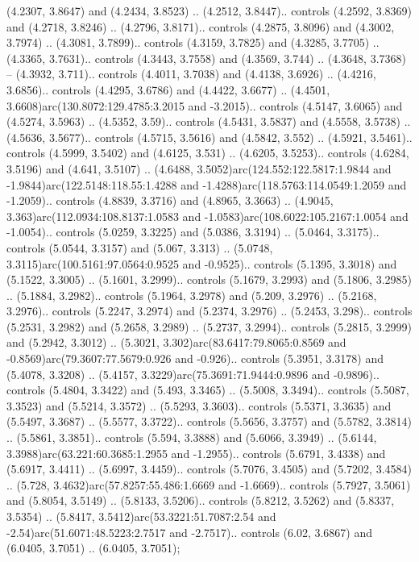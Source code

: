 (4.2307, 3.8647) and (4.2434, 3.8523) .. (4.2512, 3.8447).. controls (4.2592, 3.8369) and (4.2718, 3.8246) .. (4.2796, 3.8171).. controls (4.2875, 3.8096) and (4.3002, 3.7974) .. (4.3081, 3.7899).. controls (4.3159, 3.7825) and (4.3285, 3.7705) .. (4.3365, 3.7631).. controls (4.3443, 3.7558) and (4.3569, 3.744) .. (4.3648, 3.7368) -- (4.3932, 3.711).. controls (4.4011, 3.7038) and (4.4138, 3.6926) .. (4.4216, 3.6856).. controls (4.4295, 3.6786) and (4.4422, 3.6677) .. (4.4501, 3.6608)arc(130.8072:129.4785:3.2015 and -3.2015).. controls (4.5147, 3.6065) and (4.5274, 3.5963) .. (4.5352, 3.59).. controls (4.5431, 3.5837) and (4.5558, 3.5738) .. (4.5636, 3.5677).. controls (4.5715, 3.5616) and (4.5842, 3.552) .. (4.5921, 3.5461).. controls (4.5999, 3.5402) and (4.6125, 3.531) .. (4.6205, 3.5253).. controls (4.6284, 3.5196) and (4.641, 3.5107) .. (4.6488, 3.5052)arc(124.552:122.5817:1.9844 and -1.9844)arc(122.5148:118.55:1.4288 and -1.4288)arc(118.5763:114.0549:1.2059 and -1.2059).. controls (4.8839, 3.3716) and (4.8965, 3.3663) .. (4.9045, 3.363)arc(112.0934:108.8137:1.0583 and -1.0583)arc(108.6022:105.2167:1.0054 and -1.0054).. controls (5.0259, 3.3225) and (5.0386, 3.3194) .. (5.0464, 3.3175).. controls (5.0544, 3.3157) and (5.067, 3.313) .. (5.0748, 3.3115)arc(100.5161:97.0564:0.9525 and -0.9525).. controls (5.1395, 3.3018) and (5.1522, 3.3005) .. (5.1601, 3.2999).. controls (5.1679, 3.2993) and (5.1806, 3.2985) .. (5.1884, 3.2982).. controls (5.1964, 3.2978) and (5.209, 3.2976) .. (5.2168, 3.2976).. controls (5.2247, 3.2974) and (5.2374, 3.2976) .. (5.2453, 3.298).. controls (5.2531, 3.2982) and (5.2658, 3.2989) .. (5.2737, 3.2994).. controls (5.2815, 3.2999) and (5.2942, 3.3012) .. (5.3021, 3.302)arc(83.6417:79.8065:0.8569 and -0.8569)arc(79.3607:77.5679:0.926 and -0.926).. controls (5.3951, 3.3178) and (5.4078, 3.3208) .. (5.4157, 3.3229)arc(75.3691:71.9444:0.9896 and -0.9896).. controls (5.4804, 3.3422) and (5.493, 3.3465) .. (5.5008, 3.3494).. controls (5.5087, 3.3523) and (5.5214, 3.3572) .. (5.5293, 3.3603).. controls (5.5371, 3.3635) and (5.5497, 3.3687) .. (5.5577, 3.3722).. controls (5.5656, 3.3757) and (5.5782, 3.3814) .. (5.5861, 3.3851).. controls (5.594, 3.3888) and (5.6066, 3.3949) .. (5.6144, 3.3988)arc(63.221:60.3685:1.2955 and -1.2955).. controls (5.6791, 3.4338) and (5.6917, 3.4411) .. (5.6997, 3.4459).. controls (5.7076, 3.4505) and (5.7202, 3.4584) .. (5.728, 3.4632)arc(57.8257:55.486:1.6669 and -1.6669).. controls (5.7927, 3.5061) and (5.8054, 3.5149) .. (5.8133, 3.5206).. controls (5.8212, 3.5262) and (5.8337, 3.5354) .. (5.8417, 3.5412)arc(53.3221:51.7087:2.54 and -2.54)arc(51.6071:48.5223:2.7517 and -2.7517).. controls (6.02, 3.6867) and (6.0405, 3.7051) .. (6.0405, 3.7051);



